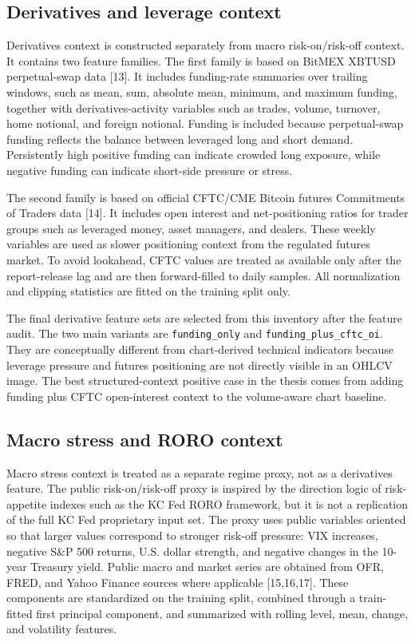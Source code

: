 \documentclass[14pt,a4paper]{extarticle}
\newcommand{\code}[1]{\texttt{#1}}
\begin{document}
\subsection{Derivatives and leverage context}

Derivatives context is constructed separately from macro risk-on/risk-off context. It contains two feature families. The first family is based on BitMEX XBTUSD perpetual-swap data [13]. It includes funding-rate summaries over trailing windows, such as mean, sum, absolute mean, minimum, and maximum funding, together with derivatives-activity variables such as trades, volume, turnover, home notional, and foreign notional. Funding is included because perpetual-swap funding reflects the balance between leveraged long and short demand. Persistently high positive funding can indicate crowded long exposure, while negative funding can indicate short-side pressure or stress.

The second family is based on official CFTC/CME Bitcoin futures Commitments of Traders data [14]. It includes open interest and net-positioning ratios for trader groups such as leveraged money, asset managers, and dealers. These weekly variables are used as slower positioning context from the regulated futures market. To avoid lookahead, CFTC values are treated as available only after the report-release lag and are then forward-filled to daily samples. All normalization and clipping statistics are fitted on the training split only.

The final derivative feature sets are selected from this inventory after the feature audit. The two main variants are \code{funding\_only} and \code{funding\_plus\_cftc\_oi}. They are conceptually different from chart-derived technical indicators because leverage pressure and futures positioning are not directly visible in an OHLCV image. The best structured-context positive case in the thesis comes from adding funding plus CFTC open-interest context to the volume-aware chart baseline.

\subsection{Macro stress and RORO context}

Macro stress context is treated as a separate regime proxy, not as a derivatives feature. The public risk-on/risk-off proxy is inspired by the direction logic of risk-appetite indexes such as the KC Fed RORO framework, but it is not a replication of the full KC Fed proprietary input set. The proxy uses public variables oriented so that larger values correspond to stronger risk-off pressure: VIX increases, negative S\&P 500 returns, U.S. dollar strength, and negative changes in the 10-year Treasury yield. Public macro and market series are obtained from OFR, FRED, and Yahoo Finance sources where applicable [15,16,17]. These components are standardized on the training split, combined through a train-fitted first principal component, and summarized with rolling level, mean, change, and volatility features.
\end{document}

